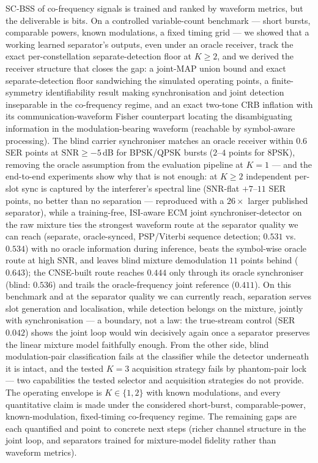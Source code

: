 \documentclass[journal]{IEEEtran}
\newcommand{\snr}{\mathrm{SNR}}
\begin{document}
SC-BSS of co-frequency signals is trained and ranked by waveform
metrics, but the deliverable is bits. On a controlled variable-count
benchmark --- short bursts, comparable powers, known modulations, a
fixed timing grid --- we showed that a working learned separator's
outputs, even under an oracle receiver, track the exact
per-constellation separate-detection floor at $K \geq 2$, and we derived the receiver
structure that closes
the gap: a joint-MAP union bound and exact separate-detection floor
sandwiching the simulated operating points, a finite-symmetry
identifiability result making synchronisation and joint detection
inseparable in
the co-frequency regime, and an exact two-tone CRB inflation with its
communication-waveform Fisher counterpart locating
the disambiguating information in the modulation-bearing waveform
(reachable by symbol-aware processing). The blind
carrier
synchroniser matches an oracle receiver within $0.6$ SER points at
$\snr \geq -5$\,dB for BPSK/QPSK bursts ($2$--$4$ points for 8PSK),
removing the oracle assumption from the
evaluation pipeline at $K{=}1$ --- and the end-to-end experiments
show why that is not enough: at $K \geq 2$ independent per-slot sync is
captured by the interferer's spectral line (SNR-flat $+7$--$11$ SER
points, no better than no separation --- reproduced with a $26\times$
larger published separator), while a training-free,
ISI-aware ECM joint synchroniser-detector on the raw mixture ties
the strongest waveform route at the separator quality we can reach
(separate, oracle-synced,
PSP/Viterbi sequence detection; $0.531$ vs.\ $0.534$) with no oracle
information during inference, beats the symbol-wise oracle route at
high SNR, and leaves blind mixture demodulation $11$ points behind
($0.643$); the CNSE-built route reaches $0.444$ only through
its oracle synchroniser (blind: $0.536$) and trails the
oracle-frequency joint reference ($0.411$). On this benchmark and at
the separator quality we can currently reach, separation serves
slot generation and localisation, while detection belongs on the mixture,
jointly with synchronisation --- a boundary, not a law: the
true-stream control (SER $0.042$) shows the joint loop would win
decisively again once a separator preserves the linear mixture model
faithfully enough. From the other side, blind modulation-pair
classification fails at the classifier while the detector underneath it
is intact, and the tested $K{=}3$ acquisition strategy fails by
phantom-pair lock
--- two capabilities the tested selector and acquisition strategies
do not provide. The operating envelope is
$K \in \{1,2\}$ with known modulations, and every quantitative claim
is made under the considered short-burst, comparable-power,
known-modulation, fixed-timing co-frequency regime. The remaining gaps
are each quantified and point to concrete next steps (richer channel
structure in the joint loop, and separators trained for mixture-model
fidelity rather than waveform metrics).
\end{document}
